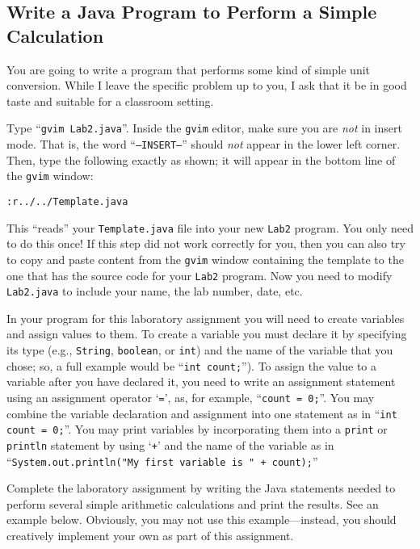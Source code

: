 \vspace*{-.1in}
\subsection*{Write a Java Program to Perform a Simple Calculation}

You are going to write a program that performs some kind of simple unit conversion. While I leave the specific problem
up to you, I ask that it be in good taste and suitable for a classroom setting.

 Type ``{\tt gvim Lab2.java}''. Inside the {\tt gvim} editor, make sure you are {\em
not} in insert mode. That is, the word ``{\tt --INSERT--}'' should {\em not} appear in the lower left corner. Then, type
the following exactly as shown; it will appear in the bottom line of the {\tt gvim} window:

\begin{center} \verb$:r../../Template.java$ \end{center}

This ``reads'' your {\tt Template.java} file into your new {\tt Lab2} program.  You only need to do this once!  If this
step did not work correctly for you, then you can also try to copy and paste content from the {\tt gvim} window
containing the template to the one that has the source code for your {\tt Lab2} program. Now you need to modify {\tt
Lab2.java} to include your name, the lab number, date, etc.

In your program for this laboratory assignment you will need to create variables and assign values to them. To create a
variable you must declare it by specifying its type (e.g., {\tt String}, {\tt boolean}, or {\tt int}) and the name of
the variable that you chose; so, a full example would be ``{\tt int count;}'').  To assign the value to a
variable after you have declared it, you need to write an assignment statement using an assignment operator `{\tt =}',
as, for example, ``{\tt count = 0;}''. You may combine the variable declaration and assignment into one statement as in
``{\tt int count = 0;}''. You may print variables by incorporating them into a {\tt print} or {\tt println} statement by
using `{\tt +}' and the name of the variable as in ``{\tt System.out.println("My first variable is " + count);}''

Complete the laboratory assignment by writing the Java statements needed to perform several simple arithmetic
calculations and print the results. See an example below. Obviously, you may not use this example---instead, you should
creatively implement your own as part of this assignment.

